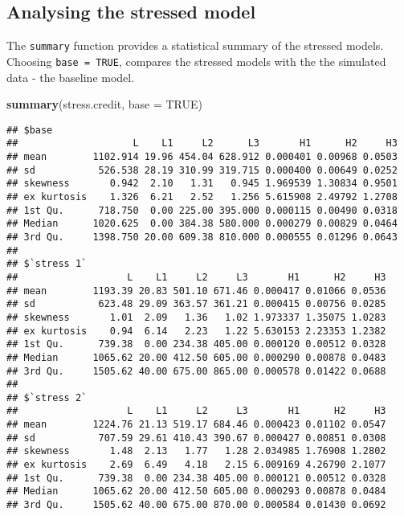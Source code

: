 \documentclass[]{article}
\newenvironment{Shaded}{\begin{snugshade}}{\end{snugshade}}
\newcommand{\DataTypeTok}[1]{\textcolor[rgb]{0.13,0.29,0.53}{#1}}
\newcommand{\KeywordTok}[1]{\textcolor[rgb]{0.13,0.29,0.53}{\textbf{#1}}}
\newcommand{\NormalTok}[1]{#1}
\newcommand{\OtherTok}[1]{\textcolor[rgb]{0.56,0.35,0.01}{#1}}
\begin{document}
\hypertarget{analysing-the-stressed-model}{%
\subsection{Analysing the stressed model}\label{analysing-the-stressed-model}}

The \texttt{summary} function provides a statistical summary of the stressed models. Choosing \texttt{base\ =\ TRUE}, compares the stressed models with the the simulated data - the baseline model.

\begin{Shaded}
\begin{Highlighting}[]
\KeywordTok{summary}\NormalTok{(stress.credit, }\DataTypeTok{base =} \OtherTok{TRUE}\NormalTok{)}
\end{Highlighting}
\end{Shaded}

\begin{verbatim}
## $base
##                    L    L1     L2      L3       H1      H2     H3
## mean        1102.914 19.96 454.04 628.912 0.000401 0.00968 0.0503
## sd           526.538 28.19 310.99 319.715 0.000400 0.00649 0.0252
## skewness       0.942  2.10   1.31   0.945 1.969539 1.30834 0.9501
## ex kurtosis    1.326  6.21   2.52   1.256 5.615908 2.49792 1.2708
## 1st Qu.      718.750  0.00 225.00 395.000 0.000115 0.00490 0.0318
## Median      1020.625  0.00 384.38 580.000 0.000279 0.00829 0.0464
## 3rd Qu.     1398.750 20.00 609.38 810.000 0.000555 0.01296 0.0643
## 
## $`stress 1`
##                   L    L1     L2     L3       H1      H2     H3
## mean        1193.39 20.83 501.10 671.46 0.000417 0.01066 0.0536
## sd           623.48 29.09 363.57 361.21 0.000415 0.00756 0.0285
## skewness       1.01  2.09   1.36   1.02 1.973337 1.35075 1.0283
## ex kurtosis    0.94  6.14   2.23   1.22 5.630153 2.23353 1.2382
## 1st Qu.      739.38  0.00 234.38 405.00 0.000120 0.00512 0.0328
## Median      1065.62 20.00 412.50 605.00 0.000290 0.00878 0.0483
## 3rd Qu.     1505.62 40.00 675.00 865.00 0.000578 0.01422 0.0688
## 
## $`stress 2`
##                   L    L1     L2     L3       H1      H2     H3
## mean        1224.76 21.13 519.17 684.46 0.000423 0.01102 0.0547
## sd           707.59 29.61 410.43 390.67 0.000427 0.00851 0.0308
## skewness       1.48  2.13   1.77   1.28 2.034985 1.76908 1.2802
## ex kurtosis    2.69  6.49   4.18   2.15 6.009169 4.26790 2.1077
## 1st Qu.      739.38  0.00 234.38 405.00 0.000121 0.00512 0.0328
## Median      1065.62 20.00 412.50 605.00 0.000293 0.00878 0.0484
## 3rd Qu.     1505.62 40.00 675.00 870.00 0.000584 0.01430 0.0692
\end{verbatim}
\end{document}
